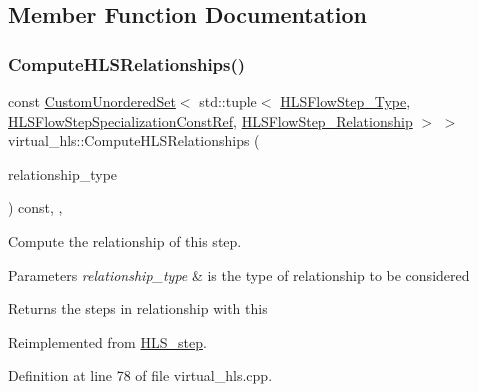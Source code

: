 \subsection{Member Function Documentation}
\mbox{\label{classvirtual__hls_abf09f6655b1a871eec7bd61bc6c9d1dd}} 
\subsubsection{\texorpdfstring{Compute\+H\+L\+S\+Relationships()}{ComputeHLSRelationships()}}
{\footnotesize\ttfamily const \hyperlink{classCustomUnorderedSet}{Custom\+Unordered\+Set}$<$ std\+::tuple$<$ \hyperlink{hls__step_8hpp_ada16bc22905016180e26fc7e39537f8d}{H\+L\+S\+Flow\+Step\+\_\+\+Type}, \hyperlink{hls__step_8hpp_a5fdd2edf290c196531d21d68e13f0e74}{H\+L\+S\+Flow\+Step\+Specialization\+Const\+Ref}, \hyperlink{hls__step_8hpp_a3ad360b9b11e6bf0683d5562a0ceb169}{H\+L\+S\+Flow\+Step\+\_\+\+Relationship} $>$ $>$ virtual\+\_\+hls\+::\+Compute\+H\+L\+S\+Relationships (\begin{DoxyParamCaption}\item[{const \hyperlink{classDesignFlowStep_a723a3baf19ff2ceb77bc13e099d0b1b7}{Design\+Flow\+Step\+::\+Relationship\+Type}}]{relationship\+\_\+type }\end{DoxyParamCaption}) const\hspace{0.3cm}{\ttfamily [override]}, {\ttfamily [protected]}, {\ttfamily [virtual]}}



Compute the relationship of this step. 


\begin{DoxyParams}{Parameters}
{\em relationship\+\_\+type} & is the type of relationship to be considered \\
\hline
\end{DoxyParams}
\begin{DoxyReturn}{Returns}
the steps in relationship with this 
\end{DoxyReturn}


Reimplemented from \hyperlink{classHLS__step_aed0ce8cca9a1ef18e705fc1032ad4de5}{H\+L\+S\+\_\+step}.



Definition at line 78 of file virtual\+\_\+hls.\+cpp.



